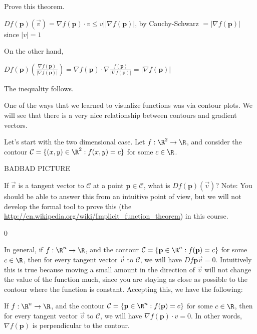 \begin{question}
	Prove this theorem.
	\begin{answer}
		 $Df(\mathbf{p})(\vec{v}) = \nabla f (\mathbf{p}) \cdot v   \leq v||\nabla f(\mathbf{p})|$, by Cauchy-Schwarz
		 $ =  |\nabla f(\mathbf{p})|$ since $|v| = 1$ 
		 
		 On the other hand, 
		 
		 $Df(\mathbf{p})( \frac{\nabla f (\mathbf{p})}{|\nabla f (\mathbf{p})|}) = \nabla f (\mathbf{p}) \cdot \nabla \frac{f (\mathbf{p})}{ |\nabla f (\mathbf{p})|}
		  = |\nabla f (\mathbf{p})|$
		  
		  The inequality follows.
	\end{answer}
\end{question}

One of the ways that we learned to visualize functions was via contour plots.  We will see that there is a very nice relationship between contours and gradient vectors.

Let's start with the two dimensional case.  Let $f: \R^2 \to \R$, and consider the contour $\mathcal{C} = \{ (x,y) \in \R^2 :  f(x,y) = c \}$ for some $c \in \R$.

BADBAD PICTURE

\begin{question}
	If $\vec{v}$ is a tangent vector to $\mathcal{C}$ at a point $\mathbf{p} \in \mathcal{C}$, what is $Df(\mathbf{p})(\vec{v})$?
	Note:  You should be able to answer this from an intuitive point of view, but we will not develop the formal tool to prove this 
	(the \href{implicit function theorem}{http://en.wikipedia.org/wiki/Implicit_function_theorem}) in this course.
	\begin{answer}
		0
	\end{answer}
\end{question}

In general, if $f:\R^n \to \R$, and the contour $\mathcal{C} = \{ \mathbf{p} \in \R^n :  f(\mathbf{p}) = c \}$ for some $c \in \R$, then for every tangent 
vector $\vec{v}$ to $\mathcal{C}$, we will have $Df{\mathbf{p}}{\vec{v}}  =0$.  
Intuitively this is true because moving a small amount in the direction of $\vec{v}$ will not change the value of the function much,
 since you are staying as close as possible to the contour where the function is constant.  Accepting this, we have the following:
 
 \begin{theorem}
  	If $f:\R^n \to \R$, and the contour $\mathcal{C} = \{ \mathbf{p} \in \R^n :  f(\mathbf{p}) = c \}$ for some $c \in \R$, then for every tangent 
vector $\vec{v}$ to $\mathcal{C}$, we will have $\nabla f(\mathbf{p}) \cdot v  =0$.  In other words, $\nabla f(\mathbf{p})$ is perpendicular to the 
contour.
 \end{theorem}
 
